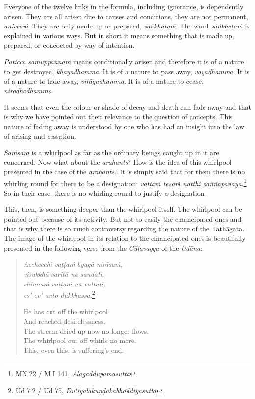 Everyone of the twelve links in the formula, including ignorance, is dependently arisen. They are all arisen due to causes and conditions, they are not permanent, \emph{aniccaṁ}. They are only made up or prepared, \emph{saṅkhataṁ}. The word \emph{saṅkhataṁ} is explained in various ways. But in short it means something that is made up, prepared, or concocted by way of intention.

\emph{Paṭicca samuppannaṁ} means conditionally arisen and therefore it is of a nature to get destroyed, \emph{khayadhamma}. It is of a nature to pass away, \emph{vayadhamma}. It is of a nature to fade away, \emph{virāgadhamma}. It is of a nature to cease, \emph{nirodhadhamma}.

It seems that even the colour or shade of decay-and-death can fade away and that is why we have pointed out their relevance to the question of concepts. This nature of fading away is understood by one who has had an insight into the law of arising and cessation.

\emph{Saṁsāra} is a whirlpool as far as the ordinary beings caught up in it are concerned. Now what about the \emph{arahants}? How is the idea of this whirlpool presented in the case of the \emph{arahants}? It is simply said that for them there is no whirling round for there to be a designation: \emph{vaṭṭaṁ tesaṁ natthi paññāpanāya}.\footnote{\href{https://suttacentral.net/mn22/pli/ms}{MN 22 / M I 141}, \emph{Alagaddūpamasutta}} So in their case, there is no whirling round to justify a designation.

This, then, is something deeper than the whirlpool itself. The whirlpool can be pointed out because of its activity. But not so easily the emancipated ones and that is why there is so much controversy regarding the nature of the Tathāgata. The image of the whirlpool in its relation to the emancipated ones is beautifully presented in the following verse from the \emph{Cūḷavagga} of the \emph{Udāna}:

\begin{quote}
\emph{Acchecchi vaṭṭaṁ byagā nirāsaṁ,}\\
\emph{visukkhā saritā na sandati,}\\
\emph{chinnaṁ vaṭṭaṁ na vattati,}\\
\emph{es' ev' anto dukkhassa}.\footnote{\href{https://suttacentral.net/ud7.2/pli/ms}{Ud 7.2 / Ud 75}, \emph{Dutiyalakuṇḍakabhaddiyasutta}}

He has cut off the whirlpool\\
And reached desirelessness,\\
The stream dried up now no longer flows.\\
The whirlpool cut off whirls no more.\\
This, even this, is suffering's end.
\end{quote}

